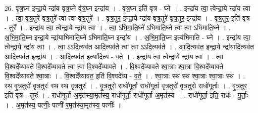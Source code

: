 \documentclass[17pt]{extarticle}
\begin{document}
26. वृ॒त्र॒घ्न इन्द्रा॒ये न्द्रा॑य वृत्र॒घ्ने वृ॑त्र॒घ्न इन्द्रा॑य । . वृ॒त्र॒घ्न इति॑ वृत्र - घ्ने । . इन्द्रा॑य त्वा॒ त्वेन्द्रा॒ये न्द्रा॑य त्वा । . त्वा॒ वृ॒त्र॒तुरे॑ वृत्र॒तुरे᳚ त्वा त्वा वृत्र॒तुरे᳚ । . वृ॒त्र॒तुर॒ इन्द्रा॒ये न्द्रा॑य वृत्र॒तुरे॑ वृत्र॒तुर॒ इन्द्रा॑य । . वृ॒त्र॒तुर॒ इति॑ वृत्र - तुरे᳚ । . इन्द्रा॑य त्वा॒ त्वेन्द्रा॒ये न्द्रा॑य त्वा । . त्वा॒ ऽभि॒मा॒ति॒घ्ने॑ ऽभिमाति॒घ्ने त्वा᳚ त्वा ऽभिमाति॒घ्ने । . अ॒भि॒मा॒ति॒घ्न इन्द्रा॒ये न्द्रा॑याभिमाति॒घ्ने॑ ऽभिमाति॒घ्न इन्द्रा॑य । . अ॒भि॒मा॒ति॒घ्न इत्य॑भिमाति - घ्ने । . इन्द्रा॑य त्वा॒ त्वेन्द्रा॒ये न्द्रा॑य त्वा । . त्वा॒ ऽऽदि॒त्यव॑त आदि॒त्यव॑ते त्वा त्वा ऽऽदि॒त्यव॑ते । . आ॒दि॒त्यव॑त॒ इन्द्रा॒ये न्द्रा॑यादि॒त्यव॑त आदि॒त्यव॑त॒ इन्द्रा॑य । . आ॒दि॒त्यव॑त॒ इत्या॑दि॒त्य - व॒ते॒ । . इन्द्रा॑य त्वा॒ त्वेन्द्रा॒ये न्द्रा॑य त्वा । . त्वा॒ वि॒श्वदे᳚व्यावते वि॒श्वदे᳚व्यावते त्वा त्वा वि॒श्वदे᳚व्यावते । . वि॒श्वदे᳚व्यावते श्वा॒त्राः श्वा॒त्रा वि॒श्वदे᳚व्यावते वि॒श्वदे᳚व्यावते श्वा॒त्राः । . वि॒श्वदे᳚व्यावत॒ इति॑ वि॒श्वदे᳚व्य - व॒ते॒ । . श्वा॒त्राः स्थ॑ स्थ श्वा॒त्राः श्वा॒त्राः स्थ॑ । . स्थ॒ वृ॒त्र॒तुरो॑ वृत्र॒तुरः॑ स्थ स्थ वृत्र॒तुरः॑ । . वृ॒त्र॒तुरो॒ राधो॑गूर्ता॒ राधो॑गूर्ता वृत्र॒तुरो॑ वृत्र॒तुरो॒ राधो॑गूर्ताः । . वृ॒त्र॒तुर॒ इति॑ वृत्र - तुरः॑ । . राधो॑गूर्ता अ॒मृत॑स्या॒मृत॑स्य॒ राधो॑गूर्ता॒ राधो॑गूर्ता अ॒मृत॑स्य । . राधो॑गूर्ता॒ इति॒ राधः॑ - गू॒र्ताः॒ । . अ॒मृत॑स्य॒ पत्नीः॒ पत्नी॑ र॒मृत॑स्या॒मृत॑स्य॒ पत्नीः᳚ । \newline
\end{document}
